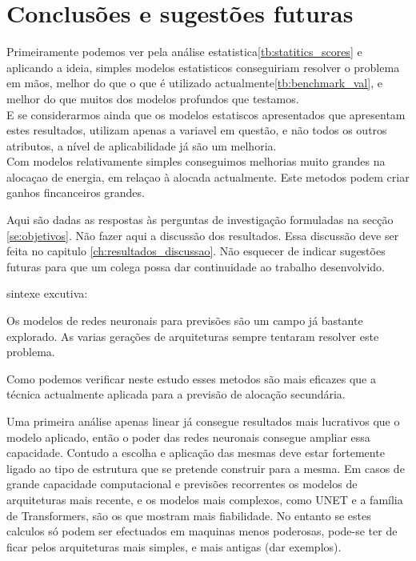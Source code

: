 \chapter{Conclusões e sugestões futuras}

Primeiramente podemos ver pela análise estatistica\ref{tb:statitics_scores} e aplicando a ideia\cite{Elsayed}, simples modelos estatisticos conseguiriam resolver o problema em mãos, melhor do que o que é utilizado actualmente\ref{tb:benchmark_val}, e melhor do que muitos dos modelos profundos que testamos. \\
E se considerarmos ainda que os modelos estatiscos apresentados que apresentam estes resultados, utilizam apenas a variavel em questão, e não todos os outros atributos, a nível de aplicabilidade já são um melhoria. \\

Com modelos relativamente simples conseguimos melhorias muito grandes na alocaçao de energia, em relaçao à alocada actualmente. Este metodos podem criar ganhos fincanceiros grandes.



Aqui são dadas as respostas às perguntas de investigação formuladas na secção \ref{se:objetivos}. Não fazer aqui a discussão dos resultados. Essa discussão deve ser feita no capitulo \ref{ch:resultados_discussao}. Não esquecer de indicar sugestões futuras para que um colega possa dar continuidade ao trabalho desenvolvido. 


sintexe excutiva:

Os modelos de redes neuronais para previsões são um campo já bastante explorado. As varias gerações de arquiteturas sempre tentaram resolver este problema.


Como podemos verificar neste estudo esses metodos são mais eficazes que a técnica actualmente aplicada para a previsão de alocação secundária.

Uma primeira análise apenas linear já consegue resultados mais lucrativos que o modelo aplicado, então o poder das redes neuronais consegue ampliar essa capacidade.
Contudo a escolha e aplicação das mesmas deve estar fortemente ligado ao tipo de estrutura que se pretende construir para a mesma.
Em casos de grande capacidade computacional e previsões recorrentes os modelos de arquiteturas mais recente, e os modelos mais complexos, como UNET e a família de Transformers, são os que mostram mais fiabilidade.
No entanto se estes calculos só podem ser efectuados em maquinas menos poderosas, pode-se ter de ficar pelos arquiteturas mais simples, e mais antigas (dar exemplos).

